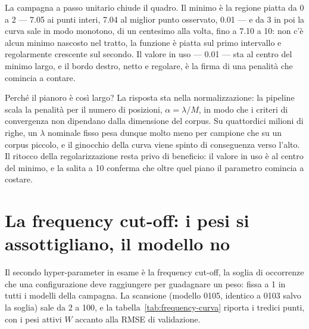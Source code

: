 La campagna a passo unitario chiude il quadro. Il minimo è la regione
piatta da 0 a 2 — 7.05 ai punti interi, 7.04 al miglior punto
osservato, 0.01 — e da 3 in poi la curva sale in modo monotono, di un
centesimo alla volta, fino a 7.10 a 10: non c'è alcun minimo nascosto
nel tratto, la funzione è piatta sul primo intervallo e regolarmente
crescente sul secondo. Il valore in uso — 0.01 — sta al centro del
minimo largo, e il bordo destro, netto e regolare, è la firma di una
penalità che comincia a contare.

Perché il pianoro è così largo? La risposta sta nella
normalizzazione: la pipeline scala la penalità per il numero di
posizioni, $\alpha = \lambda / M$, in modo che i criteri di
convergenza non dipendano dalla dimensione del corpus. Su
quattordici milioni di righe, un $\lambda$ nominale fisso pesa dunque
molto meno per campione che su un corpus piccolo, e il ginocchio della
curva viene spinto di conseguenza verso l'alto. Il ritocco della
regolarizzazione resta privo di beneficio: il valore in uso è al
centro del minimo, e la salita a 10 conferma che oltre quel piano il
parametro comincia a costare.

\section{La frequency cut-off: i pesi si assottigliano, il modello no}

Il secondo hyper-parameter in esame è la frequency cut-off, la soglia
di occorrenze che una configurazione deve raggiungere per guadagnare
un peso: fissa a 1 in tutti i modelli della campagna. La scansione
(modello 0105, identico a 0103 salvo la soglia) sale da 2 a 100, e la
tabella~\ref{tab:frequency-curva} riporta i tredici punti, con i
pesi attivi $W$ accanto alla RMSE di validazione.

